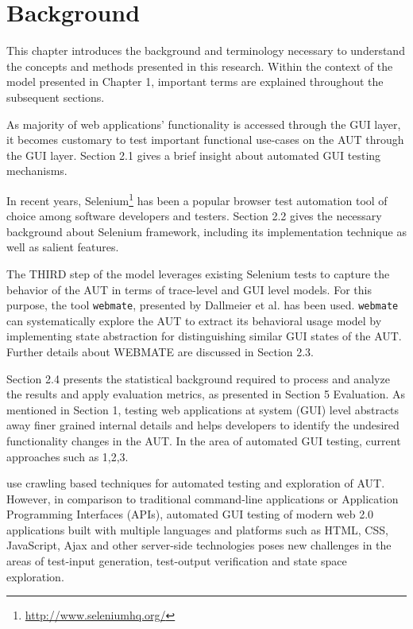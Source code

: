 \chapter{Background}
\label{Chapter2}

This chapter introduces the background and terminology necessary to understand the concepts and methods presented in this research. Within the context of the model presented in Chapter 1, important terms are explained throughout the subsequent sections.

As majority of web applications' functionality is accessed through the GUI layer, it becomes customary to test important functional use-cases on the AUT through the GUI layer. Section 2.1 gives a brief insight about automated GUI testing mechanisms.

In recent years, Selenium\footnote{\url{http://www.seleniumhq.org/}} has been a popular browser test automation tool of choice among software developers and testers. Section 2.2 gives the necessary background about Selenium framework, including its implementation technique as well as salient features.

The THIRD step of the model leverages existing Selenium tests to capture the behavior of the AUT in terms of trace-level and GUI level models. For this purpose, the tool \texttt{webmate}, presented by Dallmeier et al. has been used. \texttt{webmate} can systematically explore the AUT to extract its behavioral usage model by implementing state abstraction for distinguishing similar GUI states of the AUT. Further details about WEBMATE are discussed in Section 2.3.

Section 2.4 presents the statistical background required to process and analyze the results and apply evaluation metrics, as presented in Section 5 Evaluation.
As mentioned in Section 1, testing web applications at system (GUI) level abstracts away finer grained internal details and helps developers to identify the undesired functionality changes in the AUT.  In the area of automated GUI testing, current approaches such as  1,2,3.

use crawling based techniques for automated testing and exploration of AUT. However, in comparison to traditional command-line applications or Application Programming Interfaces (APIs), automated GUI testing of modern web 2.0 applications built with multiple languages and platforms such as HTML, CSS, JavaScript, Ajax and other server-side technologies poses new challenges in the areas of test-input generation, test-output verification and state space exploration.

